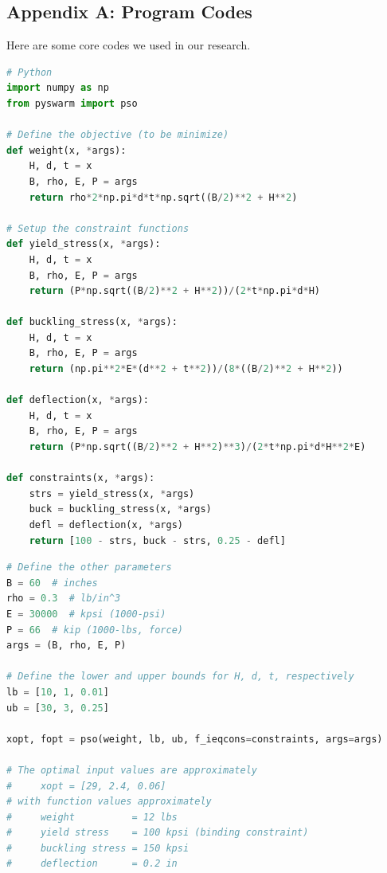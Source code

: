 \documentclass[12pt]{article}  %
\begin{document}
\begin{subappendices}  %


\section{Appendix A: Program Codes}
Here are some core codes we used in our research.


\begin{lstlisting}[language=Python, name={my1.py}]
# Python
import numpy as np
from pyswarm import pso

# Define the objective (to be minimize)
def weight(x, *args):
    H, d, t = x
    B, rho, E, P = args
    return rho*2*np.pi*d*t*np.sqrt((B/2)**2 + H**2)

# Setup the constraint functions
def yield_stress(x, *args):
    H, d, t = x
    B, rho, E, P = args
    return (P*np.sqrt((B/2)**2 + H**2))/(2*t*np.pi*d*H)

def buckling_stress(x, *args):
    H, d, t = x
    B, rho, E, P = args
    return (np.pi**2*E*(d**2 + t**2))/(8*((B/2)**2 + H**2))

def deflection(x, *args):
    H, d, t = x
    B, rho, E, P = args
    return (P*np.sqrt((B/2)**2 + H**2)**3)/(2*t*np.pi*d*H**2*E)

def constraints(x, *args):
    strs = yield_stress(x, *args)
    buck = buckling_stress(x, *args)
    defl = deflection(x, *args)
    return [100 - strs, buck - strs, 0.25 - defl]


\end{lstlisting}

\begin{lstlisting}[language=Python, name={my2.py}]
# Define the other parameters
B = 60  # inches
rho = 0.3  # lb/in^3
E = 30000  # kpsi (1000-psi)
P = 66  # kip (1000-lbs, force)
args = (B, rho, E, P)

# Define the lower and upper bounds for H, d, t, respectively
lb = [10, 1, 0.01]
ub = [30, 3, 0.25]

xopt, fopt = pso(weight, lb, ub, f_ieqcons=constraints, args=args)

# The optimal input values are approximately
#     xopt = [29, 2.4, 0.06]
# with function values approximately
#     weight          = 12 lbs
#     yield stress    = 100 kpsi (binding constraint)
#     buckling stress = 150 kpsi
#     deflection      = 0.2 in



\end{lstlisting}
\end{subappendices}
\end{document}
